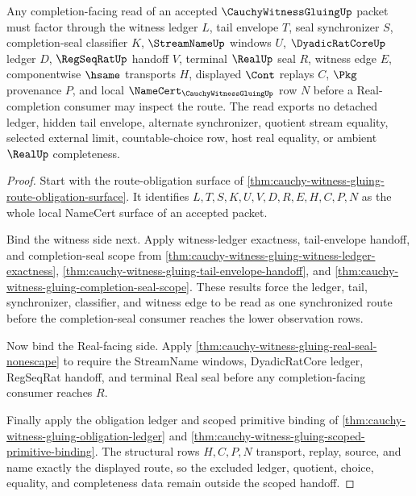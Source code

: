 \begin{theorem}
\label{thm:cauchy-witness-gluing-scoped-route-tightening}
Any completion-facing read of an accepted $\CauchyWitnessGluingUp$ packet must factor through the witness ledger $L$, tail envelope $T$, seal synchronizer $S$, completion-seal classifier $K$, $\StreamNameUp$ windows $U$, $\DyadicRatCoreUp$ ledger $D$, $\RegSeqRatUp$ handoff $V$, terminal $\RealUp$ seal $R$, witness edge $E$, componentwise $\hsame$ transports $H$, displayed $\Cont$ replays $C$, $\Pkg$ provenance $P$, and local $\NameCert_{\CauchyWitnessGluingUp}$ row $N$ before a Real-completion consumer may inspect the route. The read exports no detached ledger, hidden tail envelope, alternate synchronizer, quotient stream equality, selected external limit, countable-choice row, host real equality, or ambient $\RealUp$ completeness.
\end{theorem}
\begin{proof}
Start with the route-obligation surface of \autoref{thm:cauchy-witness-gluing-route-obligation-surface}. It identifies $L,T,S,K,U,V,D,R,E,H,C,P,N$ as the whole local NameCert surface of an accepted packet.

Bind the witness side next. Apply witness-ledger exactness, tail-envelope handoff, and completion-seal scope from \autoref{thm:cauchy-witness-gluing-witness-ledger-exactness}, \autoref{thm:cauchy-witness-gluing-tail-envelope-handoff}, and \autoref{thm:cauchy-witness-gluing-completion-seal-scope}. These results force the ledger, tail, synchronizer, classifier, and witness edge to be read as one synchronized route before the completion-seal consumer reaches the lower observation rows.

Now bind the Real-facing side. Apply \autoref{thm:cauchy-witness-gluing-real-seal-nonescape} to require the StreamName windows, DyadicRatCore ledger, RegSeqRat handoff, and terminal Real seal before any completion-facing consumer reaches $R$.

Finally apply the obligation ledger and scoped primitive binding of \autoref{thm:cauchy-witness-gluing-obligation-ledger} and \autoref{thm:cauchy-witness-gluing-scoped-primitive-binding}. The structural rows $H,C,P,N$ transport, replay, source, and name exactly the displayed route, so the excluded ledger, quotient, choice, equality, and completeness data remain outside the scoped handoff.
\end{proof}

